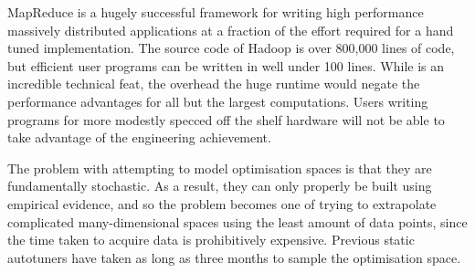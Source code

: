 MapReduce is a hugely successful framework for writing high
performance massively distributed applications at a fraction of the
effort required for a hand tuned implementation. The source code of
Hadoop is over 800,000 lines of code, but efficient user programs can
be written in well under 100 lines. While is an incredible technical
feat, the overhead the huge runtime would negate the performance
advantages for all but the largest computations. Users writing
programs for more modestly specced off the shelf hardware will not be
able to take advantage of the engineering achievement.

The problem with attempting to model optimisation spaces is that they
are fundamentally stochastic. As a result, they can only properly be
built using empirical evidence, and so the problem becomes one of
trying to extrapolate complicated many-dimensional spaces using the
least amount of data points, since the time taken to acquire data is
prohibitively expensive. Previous static autotuners have taken as long
as three months to sample the optimisation space.
